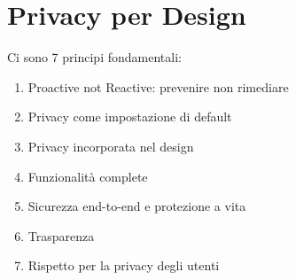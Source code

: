 \section{Privacy per Design}
\label{sec:privacybydesign}
Ci sono 7 principi fondamentali:
\begin{enumerate}[noitemsep]
    \item Proactive not Reactive: prevenire non rimediare
    \item Privacy come impostazione di default
    \item Privacy incorporata nel design
    \item Funzionalità complete
    \item Sicurezza end-to-end e protezione a vita
    \item Trasparenza
    \item Rispetto per la privacy degli utenti
\end{enumerate}

